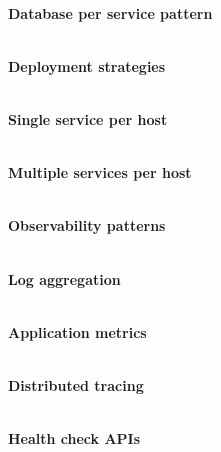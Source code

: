 \hspace*{\fill} \\ %
\noindent
\textbf{Database per service pattern}

\hspace*{\fill} \\ %
\noindent
\textbf{Deployment strategies}

\hspace*{\fill} \\ %
\noindent
\textbf{Single service per host}

\hspace*{\fill} \\ %
\noindent
\textbf{Multiple services per host}

\hspace*{\fill} \\ %
\noindent
\textbf{Observability patterns}

\hspace*{\fill} \\ %
\noindent
\textbf{Log aggregation}

\hspace*{\fill} \\ %
\noindent
\textbf{Application metrics}

\hspace*{\fill} \\ %
\noindent
\textbf{Distributed tracing}

\hspace*{\fill} \\ %
\noindent
\textbf{Health check APIs}

















